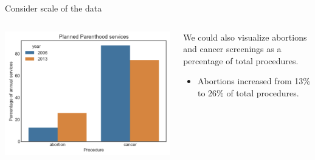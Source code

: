 \documentclass[aspectratio=169]{../latex_main/tntbeamer}  %
\begin{document}
	
	\begin{frame}{Consider scale of the data}
	
	    \begin{columns}
	        \begin{column}{.5\textwidth}

	                    \centering
	                    \includegraphics[scale=.6]{Bild53}

	        \end{column}
	        
	        
	        \begin{column}{.4\textwidth}
	        
	              We could also visualize abortions and cancer screenings as a percentage of total procedures.
	              \begin{itemize}
	                  \item Abortions increased from 13\% to 26\% of total procedures.
	              \end{itemize}
	        \end{column}
	    \end{columns}
	\end{frame}
	
	
\end{document}
